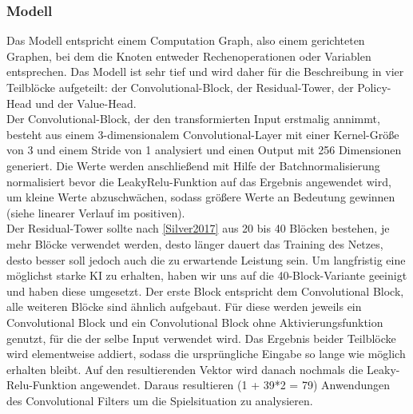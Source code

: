 \documentclass[12pt,a4paper]{article}
\begin{document}
\subsubsection{Modell}
Das Modell entspricht einem Computation Graph, also einem gerichteten Graphen, bei dem die Knoten entweder Rechenoperationen oder Variablen entsprechen. Das Modell ist sehr tief und wird daher für die Beschreibung in vier Teilblöcke aufgeteilt: der Convolutional-Block, der Residual-Tower, der Policy-Head und der Value-Head. \\
Der Convolutional-Block, der den transformierten Input erstmalig annimmt, besteht aus einem 3-dimensionalem Convolutional-Layer mit einer Kernel-Größe von 3 und einem Stride von 1 analysiert und einen Output mit 256 Dimensionen generiert. Die Werte werden anschließend mit Hilfe der Batchnormalisierung normalisiert bevor die LeakyRelu-Funktion auf das Ergebnis angewendet wird, um kleine Werte abzuschwächen, sodass größere Werte an Bedeutung gewinnen (siehe linearer Verlauf im positiven). \\
Der Residual-Tower sollte nach \ref{Silver2017} aus 20 bis 40 Blöcken bestehen, je mehr Blöcke verwendet werden, desto länger dauert das Training des Netzes, desto besser soll jedoch auch die zu erwartende Leistung sein. Um langfristig eine möglichst starke KI zu erhalten, haben wir uns auf die 40-Block-Variante geeinigt und haben diese umgesetzt. Der erste Block entspricht dem Convolutional Block, alle weiteren Blöcke sind ähnlich aufgebaut. Für diese werden jeweils ein Convolutional Block und ein Convolutional Block ohne Aktivierungsfunktion genutzt, für die der selbe Input verwendet wird. Das Ergebnis beider Teilblöcke wird elementweise addiert, sodass die ursprüngliche Eingabe so lange wie möglich erhalten bleibt. Auf den resultierenden Vektor wird danach nochmals die Leaky-Relu-Funktion angewendet. Daraus resultieren (1 + 39*2 = 79) Anwendungen des Convolutional Filters um die Spielsituation zu analysieren. \\
\end{document}
